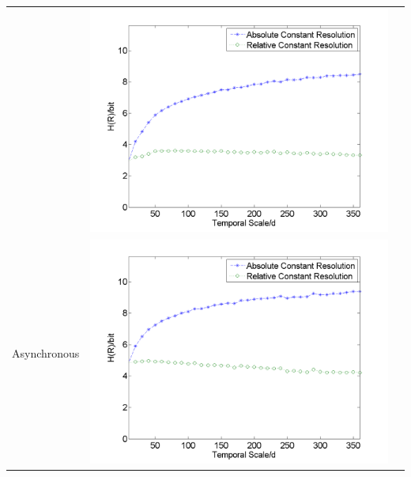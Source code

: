 \documentclass[draft,wrr]{AGUTeX}
\begin{document}
\begin{article}
\begin{table}[H]
{\begin{tabular}{ccc}
&\begin{minipage}{.6\textwidth}\includegraphics[width=\linewidth]{resultgraph/e06810000.png}\end{minipage}
\\
Asynchronous
&\begin{minipage}{.6\textwidth}\includegraphics[width=\linewidth]{resultgraph/e02143000.png}\end{minipage}
 

\end{tabular}}
\end{table}
\end{article}
\end{document}
